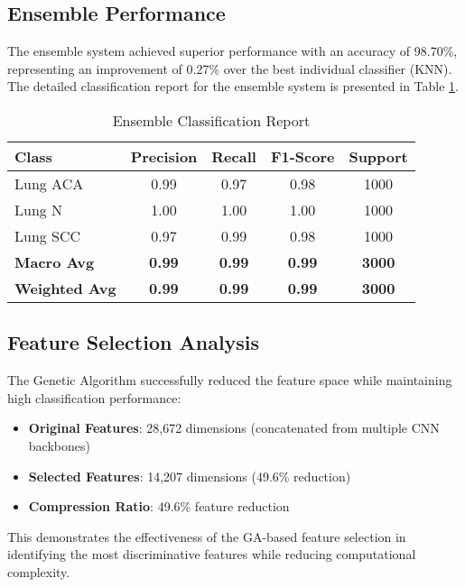 \documentclass[journal]{IEEEtran}
\begin{document}
\subsection{Ensemble Performance}

The ensemble system achieved superior performance with an accuracy of 98.70\%, representing an improvement of 0.27\% over the best individual classifier (KNN). The detailed classification report for the ensemble system is presented in Table \ref{tab:ensemble_results}.

\begin{table}[!t]
\centering
\caption{Ensemble Classification Report}
\label{tab:ensemble_results}
\begin{tabular}{@{}lcccc@{}}
\toprule
\textbf{Class} & \textbf{Precision} & \textbf{Recall} & \textbf{F1-Score} & \textbf{Support} \\
\midrule
Lung ACA & 0.99 & 0.97 & 0.98 & 1000 \\
Lung N & 1.00 & 1.00 & 1.00 & 1000 \\
Lung SCC & 0.97 & 0.99 & 0.98 & 1000 \\
\midrule
\textbf{Macro Avg} & \textbf{0.99} & \textbf{0.99} & \textbf{0.99} & \textbf{3000} \\
\textbf{Weighted Avg} & \textbf{0.99} & \textbf{0.99} & \textbf{0.99} & \textbf{3000} \\
\bottomrule
\end{tabular}
\end{table}

\subsection{Feature Selection Analysis}

The Genetic Algorithm successfully reduced the feature space while maintaining high classification performance:
\begin{itemize}
    \item \textbf{Original Features}: 28,672 dimensions (concatenated from multiple CNN backbones)
    \item \textbf{Selected Features}: 14,207 dimensions (49.6\% reduction)
    \item \textbf{Compression Ratio}: 49.6\% feature reduction
\end{itemize}

This demonstrates the effectiveness of the GA-based feature selection in identifying the most discriminative features while reducing computational complexity.
\end{document}
